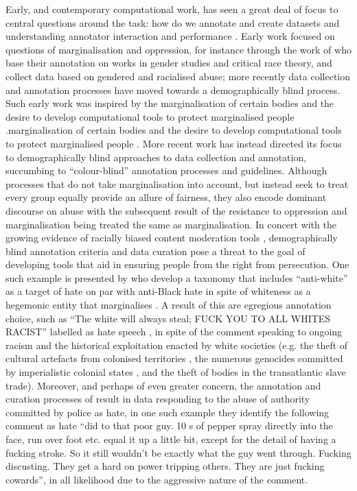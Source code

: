 Early, and contemporary computational work, has seen a great deal of focus to central questions around the task: how do we annotate and create datasets \citep{Waseem-Hovy:2016,Waseem:2017,Vidgen:2020} and understanding annotator interaction and performance \citep{Ross:2016,Waseem:2016,Vidgen:dynabench:2021}.
Early work focused on questions of marginalisation and oppression, for instance through the work of \citet{Waseem-Hovy:2016} who base their annotation on works in gender studies and critical race theory, and collect data based on gendered and racialised abuse; more recently data collection and annotation processes have moved towards a demographically blind process. Such early work was inspired by the marginalisation of certain bodies and the desire to develop computational tools to protect marginalised people \citep{Warner:2012}.marginalisation of certain bodies and the desire to develop computational tools to protect marginalised people \citep{Warner:2012}.
More recent work has instead directed its focus to demographically blind approaches to data collection and annotation, succumbing to ``colour-blind'' annotation processes and guidelines. Although processes that do not take marginalisation into account, but instead seek to treat every group equally provide an allure of fairness, they also encode dominant discourse on abuse with the subsequent result of the resistance to oppression and marginalisation being treated the same as marginalisation. In concert with the growing evidence of racially biased content moderation tools \citep{Waseem:2018,Davidson:2019}, demographically blind annotation criteria and data curation pose a threat to the goal of developing tools that aid in ensuring people from the right from persecution. One such example is presented by \citet{Salminen:2018} who develop a taxonomy that includes ``anti-white'' as a target of hate on par with anti-Black hate in spite of whiteness as a hegemonic entity that marginalises \citep{McIntosh:1988}.
A result of this are egregious annotation choice, such as ``The  white  will  always  steal;  FUCK  YOU  TO  ALL  WHITES  RACIST'' labelled as hate speech \citep{Salminen:2018}, in spite of the comment speaking to ongoing racism and the historical exploitation enacted by white societies (e.g. the theft of cultural artefacts from colonised territories \citep{Frost:2019}, the numerous genocides committed by imperialistic colonial states \citep{Weisbord:2003}, and the theft of bodies in the transatlantic slave trade). Moreover, and perhaps of even greater concern, the annotation and curation processes of \citet{Salminen:2018} result in data responding to the abuse of authority committed by police as hate, in one such example they identify the following comment as hate ``did to that poor guy. 10 s of pepper spray directly into the face, run over foot etc. equal it up a little bit, except for the detail of having a fucking stroke. So it still wouldn’t be exactly what the guy went through. Fucking discusting. They get a hard on power tripping others. They are just fucking cowards'', in all likelihood due to the aggressive nature of the comment.

